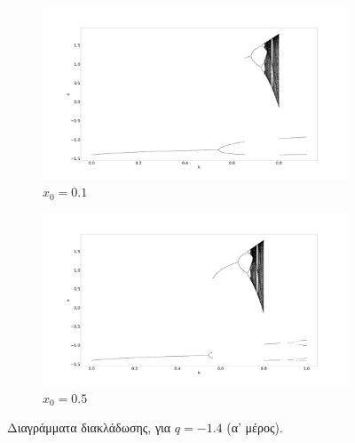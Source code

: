 \begin{figure}[ht]
	\centering
	
	\begin{subfigure}[b]{1\textwidth}
		\centering
		\includegraphics[width=\textwidth]{LateX images/graphs q14/g1}
		\caption{\(x_0=0.1\)}
		\label{f:g19}
	\end{subfigure}
	\hfill
	\begin{subfigure}[b]{1\textwidth}
		\centering
		\includegraphics[width=\textwidth]{LateX images/graphs q14/g2}
		\caption{\(x_0=0.5\)}
		\label{f:g20}
	\end{subfigure}
	\hfill
	
	\caption{ Διαγράμματα διακλάδωσης, για $q=-1.4$ (α' μέρος).}
	\label{f:20}
\end{figure}
